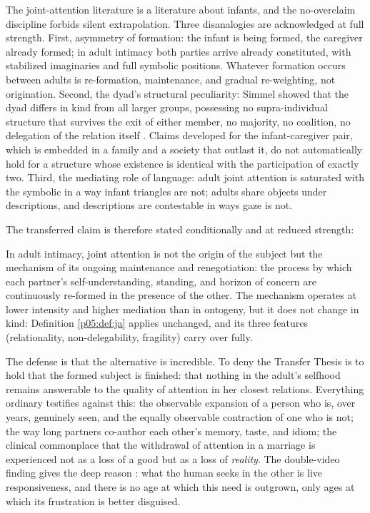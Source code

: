 The joint-attention literature is a literature about infants, and the no-overclaim discipline forbids silent extrapolation. Three disanalogies are acknowledged at full strength. First, asymmetry of formation: the infant is being formed, the caregiver already formed; in adult intimacy both parties arrive already constituted, with stabilized imaginaries and full symbolic positions. Whatever formation occurs between adults is re-formation, maintenance, and gradual re-weighting, not origination. Second, the dyad's structural peculiarity: Simmel showed that the dyad differs in kind from all larger groups, possessing no supra-individual structure that survives the exit of either member, no majority, no coalition, no delegation of the relation itself \parencite{simmel1950}. Claims developed for the infant-caregiver pair, which is embedded in a family and a society that outlast it, do not automatically hold for a structure whose existence is identical with the participation of exactly two. Third, the mediating role of language: adult joint attention is saturated with the symbolic in a way infant triangles are not; adults share objects under descriptions, and descriptions are contestable in ways gaze is not.

The transferred claim is therefore stated conditionally and at reduced strength:

\begin{prop}\label{p05:prop:transfer}
In adult intimacy, joint attention is not the origin of the subject but the mechanism of its ongoing maintenance and renegotiation: the process by which each partner's self-understanding, standing, and horizon of concern are continuously re-formed in the presence of the other. The mechanism operates at lower intensity and higher mediation than in ontogeny, but it does not change in kind: Definition \ref{p05:def:ja} applies unchanged, and its three features (relationality, non-delegability, fragility) carry over fully.
\end{prop}

The defense is that the alternative is incredible. To deny the Transfer Thesis is to hold that the formed subject is finished: that nothing in the adult's selfhood remains answerable to the quality of attention in her closest relations. Everything ordinary testifies against this: the observable expansion of a person who is, over years, genuinely seen, and the equally observable contraction of one who is not; the way long partners co-author each other's memory, taste, and idiom; the clinical commonplace that the withdrawal of attention in a marriage is experienced not as a loss of a good but as a loss of \emph{reality}. The double-video finding gives the deep reason \parencite{murray1985}: what the human seeks in the other is live responsiveness, and there is no age at which this need is outgrown, only ages at which its frustration is better disguised.

